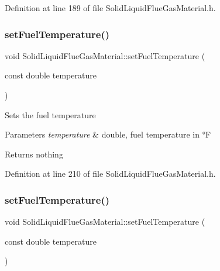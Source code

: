 Definition at line 189 of file Solid\+Liquid\+Flue\+Gas\+Material.\+h.

\mbox{\label{class_solid_liquid_flue_gas_material_a420ba1234c5f8c4b93f190b61046a589}} 
\subsubsection{\texorpdfstring{set\+Fuel\+Temperature()}{setFuelTemperature()}\hspace{0.1cm}{\footnotesize\ttfamily [1/3]}}
{\footnotesize\ttfamily void Solid\+Liquid\+Flue\+Gas\+Material\+::set\+Fuel\+Temperature (\begin{DoxyParamCaption}\item[{const double}]{temperature }\end{DoxyParamCaption})\hspace{0.3cm}{\ttfamily [inline]}}

Sets the fuel temperature 
\begin{DoxyParams}{Parameters}
{\em temperature} & double, fuel temperature in °F \\
\hline
\end{DoxyParams}
\begin{DoxyReturn}{Returns}
nothing 
\end{DoxyReturn}


Definition at line 210 of file Solid\+Liquid\+Flue\+Gas\+Material.\+h.

\mbox{\label{class_solid_liquid_flue_gas_material_a420ba1234c5f8c4b93f190b61046a589}} 
\subsubsection{\texorpdfstring{set\+Fuel\+Temperature()}{setFuelTemperature()}\hspace{0.1cm}{\footnotesize\ttfamily [2/3]}}
{\footnotesize\ttfamily void Solid\+Liquid\+Flue\+Gas\+Material\+::set\+Fuel\+Temperature (\begin{DoxyParamCaption}\item[{const double}]{temperature }\end{DoxyParamCaption})\hspace{0.3cm}{\ttfamily [inline]}}

